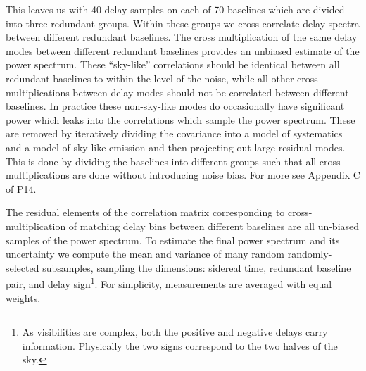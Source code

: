 \documentclass[preprint2]{aastex}
\begin{document}
This leaves us with 40 delay samples on each of 70 baselines which are divided into three redundant groups. Within these groups we cross correlate delay spectra between different redundant baselines.  The cross multiplication of the same delay modes between different redundant baselines provides an unbiased estimate of the power spectrum.  These ``sky-like'' correlations should be identical between all redundant baselines to within the level of the noise, while all other cross multiplications between delay modes should not be correlated between different baselines. In practice  these non-sky-like modes do occasionally have significant power which leaks into the correlations which sample the power spectrum.  These are removed by iteratively dividing the covariance into a model of systematics and a model of sky-like emission and then projecting out large residual modes. This is done by dividing the baselines into different groups such that all cross-multiplications are done without introducing noise bias.  For more see Appendix C of P14.

The residual elements of the correlation matrix corresponding to cross-multiplication of matching delay bins between different baselines are all un-biased samples of the power spectrum. To estimate the final power spectrum and its uncertainty we compute the mean and variance of many random randomly-selected subsamples, sampling the dimensions: sidereal time, redundant baseline pair, and delay sign\footnote{As visibilities are complex, both the positive and negative delays  carry  information. Physically the two signs correspond to the two halves of the sky.}. For simplicity, measurements are averaged with equal weights.
\end{document}
